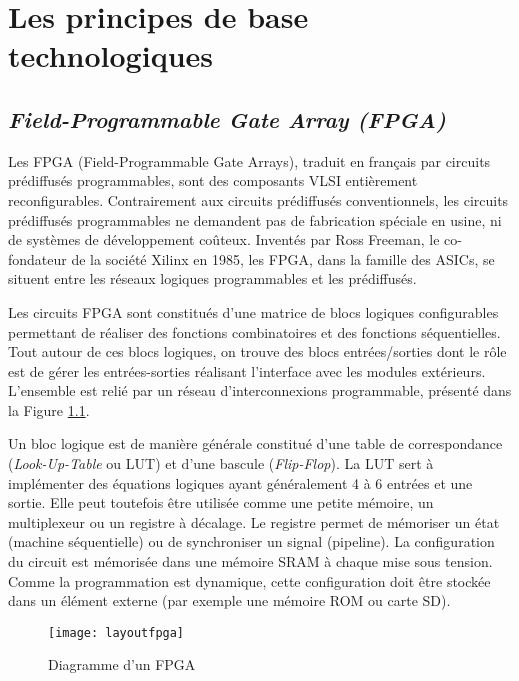\chapter{Les principes de base technologiques}
\label{chap:principe}
\OnehalfSpacing
\section{\emph{Field-Programmable Gate Array (FPGA)}}
\label{sec:fpga}
Les FPGA (Field-Programmable Gate Arrays), traduit en français par circuits prédiffusés 
programmables\cite{hubinweb},
sont des composants \gls{VLSI}  
entièrement reconfigurables. Contrairement aux circuits prédiffusés conventionnels, les circuits
prédiffusés programmables ne demandent pas de fabrication spéciale en usine, ni de systèmes de 
développement coûteux. Inventés par Ross Freeman, le co-fondateur de la société Xilinx en 1985, les FPGA, dans la famille
des \glspl{ASIC}, se situent entre les réseaux logiques programmables et les prédiffusés. 

Les circuits FPGA sont constitués d'une matrice de blocs logiques configurables permettant de réaliser des fonctions
combinatoires et des fonctions séquentielles. Tout autour de ces blocs logiques, on trouve des blocs entrées/sorties
dont le rôle est de gérer les entrées-sorties réalisant l'interface avec les modules extérieurs.
L'ensemble est relié par un réseau d'interconnexions programmable, présenté dans la Figure \ref{fig:layoutfpga}. 

Un bloc logique est de manière générale constitué d'une table de correspondance
(\emph{Look-Up-Table} ou \gls{LUT}) et d'une bascule (\emph{Flip-Flop}). 
La \gls{LUT} sert à implémenter
des équations logiques ayant généralement 4 à 6 entrées et une sortie. 
Elle peut toutefois être utilisée comme une petite
mémoire, un multiplexeur ou un registre à décalage. 
Le registre permet de mémoriser un état (machine séquentielle) ou
de synchroniser un signal (pipeline).
La configuration du circuit est mémorisée dans une mémoire \gls{SRAM} 
à chaque mise sous tension. Comme la programmation est dynamique,
cette configuration doit être stockée dans un élément externe (par exemple une mémoire \gls{ROM} ou carte \gls{SD}).

\begin{figure}[h]
	\centering
	\texttt{[image: layoutfpga]}
	\caption{Diagramme d'un FPGA\cite{fpgaprototype}}
	\label{fig:layoutfpga}
	\vspace{-2mm}
\end{figure}

